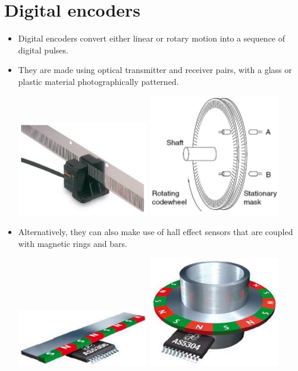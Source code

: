 \documentclass[11pt]{article}
\begin{document}
\section{Digital encoders}
\label{sec:org1d495a1}
\begin{itemize}
\item Digital encoders convert either linear or rotary motion into a sequence of digital pulses.
\item They are made using optical transmitter and receiver pairs, with a glass or plastic material photographically patterned.
\begin{center}
\includegraphics[width=0.45\textwidth]{./images/linear-encoder-using-light.png}
\includegraphics[width=0.45\textwidth]{./images/rotary-encoder-using-light.png}
\end{center}

\item Alternatively, they can also make use of hall effect sensors that are coupled with magnetic rings and bars.
\begin{center}
\includegraphics[width=0.45\textwidth]{./images/linear-encoder-using-magnets.png}
\includegraphics[width=0.45\textwidth]{./images/rotary-encoder-using-magnets.png}
\end{center}
\end{itemize}
\end{document}
